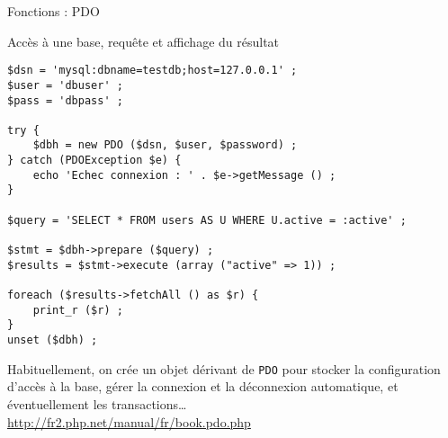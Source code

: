 \begin{frame}[containsverbatim]{Fonctions : PDO}
	\begin{block}{Accès à une base, requête et affichage du résultat}
		\begin{lstlisting}
$dsn = 'mysql:dbname=testdb;host=127.0.0.1' ;
$user = 'dbuser' ;
$pass = 'dbpass' ;

try {
    $dbh = new PDO ($dsn, $user, $password) ;
} catch (PDOException $e) {
    echo 'Echec connexion : ' . $e->getMessage () ;
}

$query = 'SELECT * FROM users AS U WHERE U.active = :active' ;

$stmt = $dbh->prepare ($query) ;
$results = $stmt->execute (array ("active" => 1)) ;

foreach ($results->fetchAll () as $r) {
	print_r ($r) ;
}
unset ($dbh) ;
		\end{lstlisting}
	\end{block}
	Habituellement, on crée un objet dérivant de \texttt{PDO} pour stocker la configuration d’accès à la base,  gérer la connexion et la déconnexion automatique, et éventuellement les transactions\ldots \\
	\url{http://fr2.php.net/manual/fr/book.pdo.php}
\end{frame}